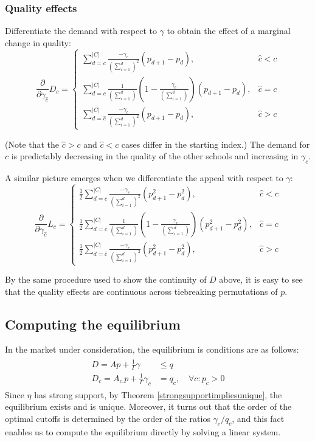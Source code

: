 \documentclass[12pt]{article}
\theoremstyle{definition}
\begin{document}
\subsubsection{Quality effects}
Differentiate the demand with respect to $\gamma$ to obtain the effect of a marginal change in quality:
\[\frac{\partial}{\partial\gamma_{\hat c}} D_c = \begin{cases}
\sum_{d=c}^{|C|} \frac{-\gamma_c}{\left(\sum_{i=1}^{d} \right)^2} \left(p_{d+1} - p_d \right), & \hat c < c \\
\sum_{d=c}^{|C|} \frac{1}{\left(\sum_{i=1}^{d} \right)}
    \left( 1 - \frac{\gamma_c}{\left(\sum_{i=1}^{d} \right)}\right)
    \left(p_{d+1} - p_d \right), & \hat c = c\\
\sum_{d=\hat c}^{|C|} \frac{-\gamma_c}{\left(\sum_{i=1}^{d} \right)^2} \left(p_{d+1} - p_d \right), & \hat c > c
\end{cases}\]

(Note that the $\hat c > c$ and $ \hat c < c$ cases differ in the starting index.) The demand for $c$ is predictably decreasing in the quality of the other schools and increasing in $\gamma_c$. 

A similar picture emerges when we differentiate the appeal with respect to $\gamma$:
\[\frac{\partial}{\partial\gamma_{\hat c}} L_c = \begin{cases}
\frac{1}{2}\sum_{d=c}^{|C|} \frac{-\gamma_c}{\left(\sum_{i=1}^{d} \right)^2} \left(p_{d+1}^2 - p_d^2 \right), & \hat c < c \\
\frac{1}{2}\sum_{d=c}^{|C|} \frac{1}{\left(\sum_{i=1}^{d} \right)}
    \left( 1 - \frac{\gamma_c}{\left(\sum_{i=1}^{d} \right)}\right)
    \left(p_{d+1}^2 - p_d^2 \right), & \hat c = c\\
\frac{1}{2}\sum_{d=\hat c}^{|C|} \frac{-\gamma_c}{\left(\sum_{i=1}^{d} \right)^2} \left(p_{d+1}^2 - p_d^2 \right), & \hat c > c
\end{cases}\]

By the same procedure used to show the continuity of $D$ above, it is easy to see that the quality effects are continuous across tiebreaking permutations of $p$.





\subsection{Computing the equilibrium}
In the market under consideration, the equilibrium is conditions are as follows:
\begin{gather} \label{ssmnleqconds}
\begin{aligned}
D = A p + \frac{1}{\Gamma}\gamma &\leq q \\
D_c = A_{c.} p + \frac{1}{\Gamma} \gamma_c &= q_c, \quad \forall c: p_c > 0
\end{aligned}
\end{gather}
Since $\eta$ has strong support, by Theorem \ref{strongsupportimpliesunique}, the equilibrium exists and is unique. Moreover, it turns out that the order of the optimal cutoffs is determined by the order of the ratios $\gamma_c / q_c$, and this fact  enables us to compute the equilibrium directly by solving a linear system.
\end{document}
